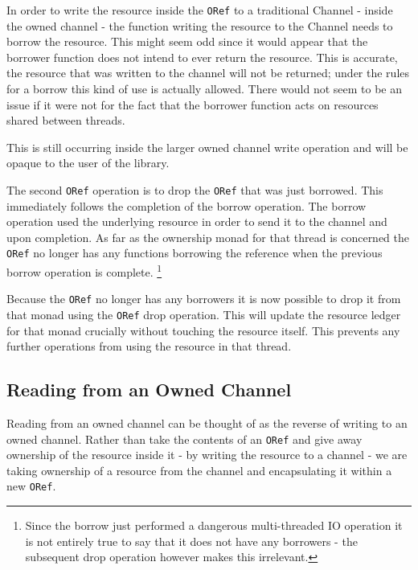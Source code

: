 \documentclass[onehalf,11pt]{beavtex}
\begin{document}
In order to write the resource inside the \texttt{ORef} to a traditional Channel
- inside the owned channel - the function writing the resource to the
Channel needs to borrow the resource.
This might seem odd since it would appear that the borrower function does not
intend to ever return the resource.  This is accurate, the resource that was
written to the channel will not be returned; under the rules for a
borrow this kind of use is actually allowed.
There would not seem to be an issue if it were not for the fact that
the borrower function acts on resources shared between threads.


This is still occurring inside the larger owned channel write operation and will
be opaque to the user of the library.

The second \texttt{ORef} operation is to drop the \texttt{ORef} that was just
borrowed. This immediately follows the completion of the borrow operation. The
borrow operation used the underlying resource in order to send it to the channel
and upon completion. As far as the ownership monad for that thread is
concerned the \texttt{ORef} no longer has any functions borrowing the reference
when the previous borrow operation is complete.
\footnote{Since the borrow just performed a dangerous multi-threaded IO operation
  it is not entirely true to say that it does not have any borrowers - the
  subsequent drop operation however makes this irrelevant.}

Because the \texttt{ORef} no longer has any borrowers it is now possible to
drop it from that monad using the \texttt{ORef} drop operation.  This will
update the resource ledger for that monad crucially without touching the
resource itself.
This prevents any further operations from using the resource
in that thread.

\subsection{Reading from an Owned Channel}

Reading from an owned channel can be thought of as the reverse of
writing to an owned channel.  Rather than take the contents of an
\texttt{ORef} and give away ownership of the resource inside it - by writing the
resource to a channel - we are taking ownership of a resource from the channel
and encapsulating it within a new \texttt{ORef}.
\end{document}
